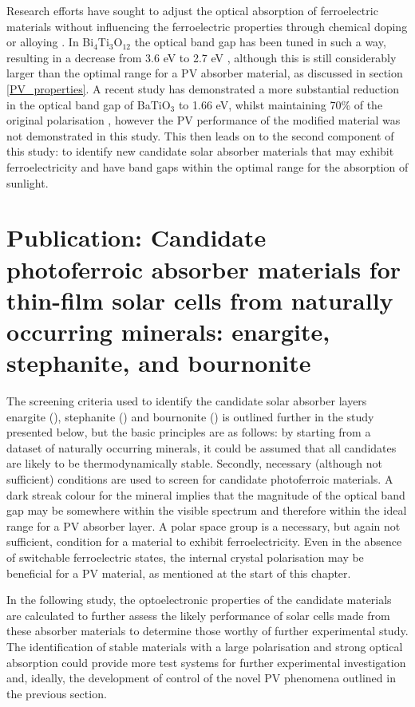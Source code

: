 \documentclass[11pt, twoside]{report}
\begin{document}
Research efforts have sought to adjust the optical absorption of ferroelectric materials without influencing the ferroelectric properties through chemical doping or alloying \cite{FE_PV_rev1}. In Bi$_4$Ti$_3$O$_{12}$ the optical band gap has been tuned in such a way, resulting in a decrease from 3.6 eV to 2.7 eV \cite{FE_PV_rev1_83}, although this is still considerably larger than the optimal range for a PV absorber material, as discussed in section \ref{PV_properties}. A recent study has demonstrated a more substantial reduction in the optical band gap of BaTiO$_3$  to 1.66 eV, whilst maintaining 70\% of the original polarisation \cite{FE-PV_lett}, however the PV performance of the modified material was not demonstrated in this study. 
This then leads on to the second component of this study: to identify new candidate solar absorber materials that may exhibit ferroelectricity and have band gaps within the optimal range for the absorption of sunlight. 

\section{Publication: Candidate photoferroic absorber materials for thin-film
solar cells from naturally occurring minerals:
enargite, stephanite, and bournonite}\label{sulfosalts1}


The screening criteria used to identify the candidate solar absorber layers enargite ({\enargite}), stephanite ({\stephanite}) and bournonite ({\bournonite}) is outlined further in the study presented below, but the basic principles are as follows: by starting from a dataset of naturally occurring minerals, it could be assumed that all candidates are likely to be thermodynamically stable. Secondly, necessary (although not sufficient) conditions are used to screen for candidate photoferroic materials. A dark streak colour for the mineral implies that the magnitude of the optical band gap may be somewhere within the visible spectrum and therefore within the ideal range for a PV absorber layer. A polar space group is a necessary, but again not sufficient, condition for a material to exhibit ferroelectricity. Even in the absence of switchable ferroelectric states, the internal crystal polarisation may be beneficial for a PV material, as mentioned at the start of this chapter.

In the following study, the optoelectronic properties of the candidate materials are calculated to further assess the likely performance of solar cells made from these absorber materials to determine those worthy of further experimental study. The identification of stable materials with a large polarisation and strong optical absorption could provide more test systems for further experimental investigation and, ideally, the development of control of the novel PV phenomena outlined in the previous section.
\end{document}
